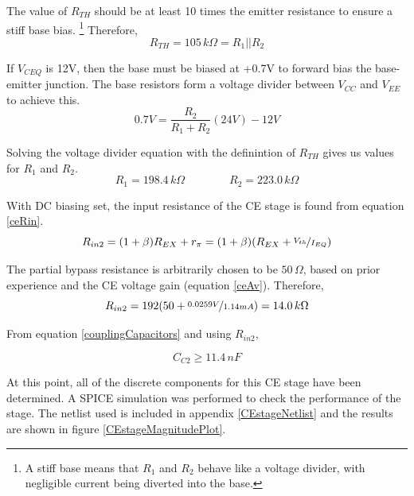 \documentclass[titlepage, letterpaper, 10.5pt]{article}
\begin{document}
The value of $R_{TH}$ should be at least 10 times the emitter
resistance to ensure a stiff base bias. \footnote{A stiff base means
that $R_{1}$ and $R_{2}$ behave like a voltage divider, with 
negligible current being diverted into the base.} Therefore,
\begin{equation*}
R_{TH}=105\,k\Omega=R_{1}||R_{2}
\end{equation*}

If $V_{CEQ}$ is 12V, then the base must be biased at +0.7V to forward
bias the base-emitter junction. The base resistors form a voltage
divider between $V_{CC}$ and $V_{EE}$ to achieve this.
\begin{equation*}
0.7V=\frac{R_{2}}{R_{1}+R_{2}}(24V)-12V
\end{equation*}

Solving the voltage divider equation with the definintion of $R_{TH}$
gives us values for $R_{1}$ and $R_{2}$.
\begin{equation*}
R_{1}=198.4\,k\Omega\qquad\qquad R_{2}=223.0\,k\Omega
\end{equation*}

With DC biasing set, the input resistance of the CE stage is found
from equation \ref{ceRin}.
\begin{equation*}
R_{in2}=(1+\beta)R_{EX}+r_{\pi}=
(1+\beta)(R_{EX}+\nicefrac{V_{th}}{I_{EQ}})
\end{equation*}

The partial bypass resistance is arbitrarily chosen to be
$50\,\Omega$, based on prior experience and the CE voltage gain
(equation \ref{ceAv}). Therefore,
\begin{equation*}
R_{in2}=192(50+\nicefrac{0.0259V}{1.14mA})=14.0\,k\Omega
\end{equation*}

From equation \ref{couplingCapacitors} and using $R_{in2}$,

\begin{equation*}
C_{C2}\geq 11.4\,nF
\end{equation*}

At this point, all of the discrete components for this CE stage have
been determined. A SPICE simulation was performed to check the
performance of the stage. The netlist used is included
in appendix \ref{CEstageNetlist} and the results are shown in figure
\ref{CEstageMagnitudePlot}.
\end{document}

